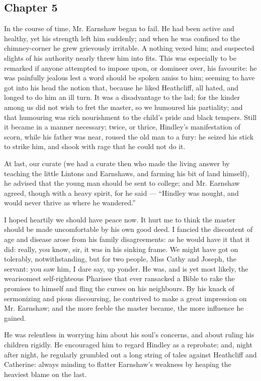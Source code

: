 \subsection*{Chapter 5}

\par In the course of time, Mr. Earnshaw began to fail. He had been active and healthy, yet his strength left him suddenly; and when he was confined to the chimney-corner he grew grievously irritable. A nothing vexed him; and suspected slights of his authority nearly threw him into fits. This was especially to be remarked if anyone attempted to impose upon, or domineer over, his favourite: he was painfully jealous lest a word should be spoken amiss to him; seeming to have got into his head the notion that, because he liked Heathcliff, all hated, and longed to do him an ill turn. It was a disadvantage to the lad; for the kinder among us did not wish to fret the master, so we humoured his partiality; and that humouring was rich nourishment to the child's pride and black tempers. Still it became in a manner necessary; twice, or thrice, Hindley's manifestation of scorn, while his father was near, roused the old man to a fury: he seized his stick to strike him, and shook with rage that he could not do it.
\par At last, our curate (we had a curate then who made the living answer by teaching the little Lintons and Earnshaws, and farming his bit of land himself), he advised that the young man should be sent to college; and Mr. Earnshaw agreed, though with a heavy spirit, for he said — “Hindley was nought, and would never thrive as where he wandered.”
\par I hoped heartily we should have peace now. It hurt me to think the master should be made uncomfortable by his own good deed. I fancied the discontent of age and disease arose from his family disagreements: as he would have it that it did: really, you know, sir, it was in his sinking frame. We might have got on tolerably, notwithstanding, but for two people, Miss Cathy and Joseph, the servant: you saw him, I dare say, up yonder. He was, and is yet most likely, the wearisomest self-righteous Pharisee that ever ransacked a Bible to rake the promises to himself and fling the curses on his neighbours. By his knack of sermonizing and pious discoursing, he contrived to make a great impression on Mr. Earnshaw; and the more feeble the master became, the more influence he gained.
\par He was relentless in worrying him about his soul's concerns, and about ruling his children rigidly. He encouraged him to regard Hindley as a reprobate; and, night after night, he regularly grumbled out a long string of tales against Heathcliff and Catherine: always minding to flatter Earnshaw's weakness by heaping the heaviest blame on the last.
